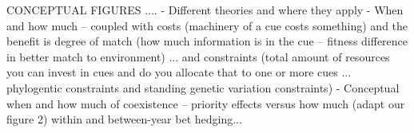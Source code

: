 \documentclass[11pt,letterpaper]{article}
\begin{document}
CONCEPTUAL FIGURES ....
- Different theories and where they apply
- When and how much -- coupled with costs (machinery of a cue costs something) and the benefit is degree of match (how much information is in the cue -- fitness difference in better match to environment) ... and constraints (total amount of resources you can invest in cues and do you allocate that to one or more cues ... phylogentic constraints and standing genetic variation constraints) 
- Conceptual when and how much of coexistence -- priority effects versus how much (adapt our figure 2) within and between-year bet hedging...


\newpage


\end{document}
